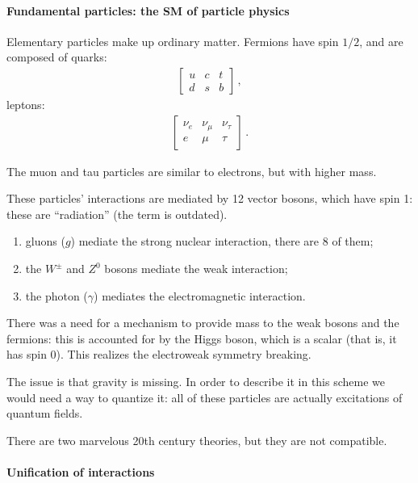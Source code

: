 \documentclass[main.tex]{subfiles}
\begin{document}
\paragraph{Fundamental particles: the SM of particle physics}

Elementary particles make up ordinary matter. 
Fermions have spin \(1/2\), and are composed of quarks: 
%
\begin{align}
\left[\begin{array}{ccc}
u & c & t \\ 
d & s & b
\end{array}\right]
\,,
\end{align}
%
leptons: 
%
\begin{align}
\left[\begin{array}{ccc}
\nu_{e} & \nu_{\mu } & \nu_{\tau } \\ 
e & \mu  & \tau 
\end{array}\right]
\,.
\end{align}

The muon and tau particles are similar to electrons, but with higher mass. 

These particles' interactions are mediated by 12
vector bosons, which have spin 1: these are ``radiation'' (the term is outdated).

\begin{enumerate}
  \item gluons (\(g\)) mediate the strong nuclear interaction, there are 8 of them;
  \item the \(W^{\pm}\) and \(Z^{0}\) bosons mediate the weak interaction;
  \item the photon (\(\gamma \)) mediates the electromagnetic interaction. 
\end{enumerate}

There was a need for a mechanism to provide mass to the weak bosons and the fermions: this is accounted for by the Higgs boson, which is a scalar (that is, it has spin 0). 
This realizes the electroweak symmetry breaking.

The issue is that gravity is missing.
In order to describe it in this scheme we would need a way to quantize it: all of these particles are actually excitations of quantum fields. 

There are two marvelous 20th century theories, but they are not compatible. 

\paragraph{Unification of interactions}
\end{document}
